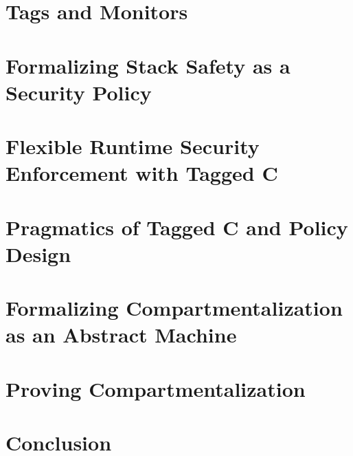 \documentclass{report}
\begin{document}
\chapter{Tags and Monitors}
\label{ch:background}

\chapter{Formalizing Stack Safety as a Security Policy}
\label{ch:stacksafety}

\chapter{Flexible Runtime Security Enforcement with Tagged C}
\label{ch:taggedc}

\chapter{Pragmatics of Tagged C and Policy Design}
\label{ch:pragmatics}

\chapter{Formalizing Compartmentalization as an Abstract Machine}
\label{ch:compartments}

\chapter{Proving Compartmentalization}
\label{ch:proof}

\chapter{Conclusion}



\end{document}
